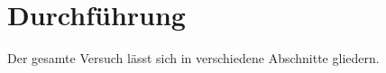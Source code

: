 \section{Durchführung}
\label{sec:Durchführung}
Der gesamte Versuch lässt sich in verschiedene Abschnitte gliedern. 